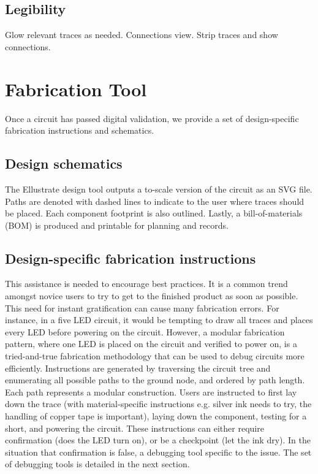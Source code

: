 \documentclass{sigchi}
\begin{document}
    
    \subsection{Legibility}
        Glow relevant traces as needed.
        Connections view.
        Strip traces and show connections.

\section{Fabrication Tool}
    Once a circuit has passed digital validation, we provide a set of design-specific fabrication instructions and schematics.

    \subsection{Design schematics}
        The Ellustrate design tool outputs a to-scale version of the circuit as an SVG file. Paths are denoted with dashed lines to indicate to the user where traces should be placed. Each component footprint is also outlined. Lastly, a bill-of-materials (BOM) is produced and printable for planning and records.

    \subsection{Design-specific fabrication instructions}
        This assistance is needed to encourage best practices. It is a common trend amongst novice users to try to get to the finished product as soon as possible. This need for instant gratification can cause many fabrication errors. For instance, in a five LED circuit, it would be tempting to draw all traces and places every LED before powering on the circuit. However, a modular fabrication pattern, where one LED is placed on the circuit and verified to power on, is a tried-and-true fabrication methodology that can be used to debug circuits more efficiently. Instructions are generated by traversing the circuit tree and enumerating all possible paths to the ground node, and ordered by path length. Each path represents a modular construction. Users are instructed to first lay down the trace (with material-specific instructions e.g. silver ink needs to try, the handling of copper tape is important), laying down the component, testing for a short, and powering the circuit. These instructions can either require confirmation (does the LED turn on), or be a checkpoint (let the ink dry). In the situation that confirmation is false, a debugging tool specific to the issue. The set of debugging tools is detailed in the next section.
\end{document}
